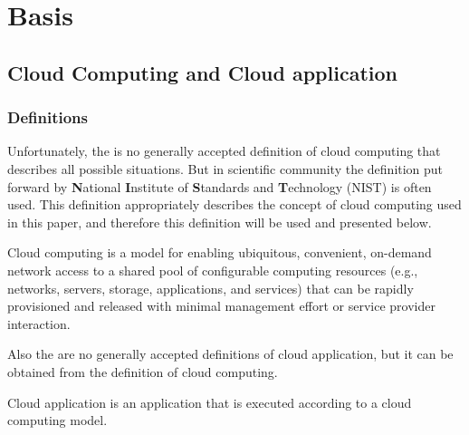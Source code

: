 
\chapter{Basis}
\label{chap:basis}

\section{Cloud Computing and Cloud application} \label{sec:cloud}

\subsection{Definitions}
Unfortunately, the is no generally accepted definition of cloud computing that describes all possible situations. 
But in scientific community the definition put forward by \textbf{N}ational \textbf{I}nstitute of \textbf{S}tandards and \textbf{T}echnology (NIST) is often used. 
This definition appropriately describes the concept of cloud computing used in this paper, and therefore this definition will be used and presented below.
\begin{definition}
	\label{def:nist}
Cloud computing is a model for enabling ubiquitous, convenient, on-demand network access to a shared
pool of configurable computing resources (e.g., networks, servers, storage, applications, and services) that
can be rapidly provisioned and released with minimal management effort or service provider interaction. \cite*{nist}
\end{definition}
Also the are no generally accepted definitions of cloud application, but it can be obtained from the definition of cloud computing.
\begin{definition} 
	\label{def:capp}
	Cloud application is an application that is executed according to a cloud computing model. \cite*{cloudapp}
\end{definition} 
